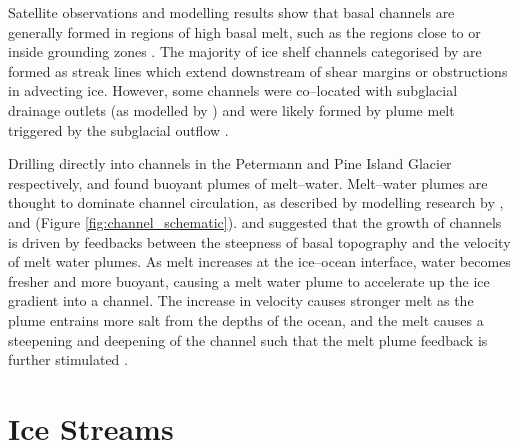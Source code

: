 Satellite observations \citep{rignot2008recent} and modelling results  \citep{sergienko2013basal} show that basal channels are generally formed in regions of high basal melt, such as the regions close to or inside grounding zones \citep{alley2016impacts}.
The majority of ice shelf channels categorised by \cite{alley2016impacts} are formed as streak lines which extend downstream of shear margins or obstructions in advecting ice.  However, some channels were co--located with subglacial drainage outlets (as modelled by \cite{le2013evidence}) and were likely formed by plume melt triggered by the subglacial outflow \cite{alley2016impacts}.

Drilling directly into channels in the Petermann and Pine Island Glacier respectively, \cite{rignot2008channelized} and \cite{stanton2013channelized} found buoyant plumes of melt--water. Melt--water plumes are thought to dominate channel circulation,  as described by modelling research by \cite{jenkins2011convection}, \cite{ sergienko2013basal} and \cite{gladish2012ice} (Figure \ref{fig:channel_schematic}). \cite{ sergienko2013basal} and \cite{gladish2012ice} suggested that the growth of channels is driven by feedbacks between the steepness of basal topography and the velocity of melt water plumes. As melt increases at the ice--ocean interface, water becomes fresher and more buoyant, causing a melt water plume to accelerate up the ice gradient into a channel. The increase in velocity causes stronger melt as the plume entrains more salt from the depths of the ocean, and the melt causes a steepening and deepening of the channel such that the melt plume feedback is further stimulated \citep{sergienko2013basal}.




\section{Ice Streams} \label{sec:ice_streams}

